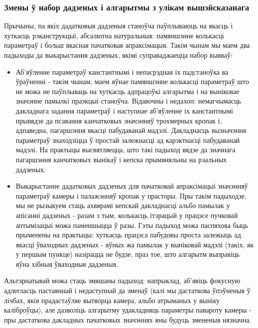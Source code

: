 \subsubsection*{Змены ў набор дадзеных і алгарытмы з улікам вышэйсказанага}
Прычыны, па якіх дадатковыя дадзеныя станоўча паўплываюць на якасць і хуткасць рэканструкцыі, абсалютна натуральныя: памяншэнне колькасці параметраў і больш якасная пачатковая апраксімацыя. Такім чынам мы маем два падыходы да выкарыстання дадзеных, якімі суправаджаецца набор выяваў:
\begin{itemize}
    \item Аб'яўленне параметраў канстантнымі і непасрэдная іх падстаноўка ва ўраўненні - такім чынам, маем яўнае памяншэнне колькасці параметраў што не можа не паўплываць на хуткасць адпрацоўкі алгарытма і на выніковае значэнне памылкі праэкцыі станоўча. Відавочны і недахоп: немагчымасць дакладнага задання параметраў і наступнае аб'яўленне іх канстантнымі прывядзе да псавання канчатковых значэнняў трохмерных кропак і, адпаведна, пагаршэння якасці пабудаванай мадэлі. Дакладнасць вызначэння параметраў знаходзіцца ў простай залежнасці ад карэктнасці пабудаванай мадэлі. На практыцы высвятляецца, што такі падыход вядзе да значнага пагаршэння канчатковых вынікаў і кепска прымяняльны на рэальных дадзеных.
    \item Выкарыстанне дадатковых дадзеных для пачатковай апраксімацыі значэнняў параметраў камеры і палажэнняў кропак у прасторы. Пры такім падыходзе, мы не рызыкуем стаць ахвярамі кепскай дакладнасці альбо памылак у апісанні дадзеных - разам з тым, колькасць ітэрацый у працэсе пучковай аптымізацыі можа паменшыцца ў разы. Гэты падыход можа паспяхова быць прыменены на практыцы: хуткасць працэса пабудовы проста залежыць ад якасці ўваходных дадзеных - яўных жа памылак у выніковай мадэлі (такіх, як у першым пункце) назірацца не будзе, праз тое, што алгарытм выправіць яўна хібныя ўваходныя дадзеныя.
\end{itemize}
Альтэрнатывай можа стаць змяшаны падыход: напрыклад, аб'явіць фокусную адлегласць пастаяннай і недаступнай да зменаў (калі мы дастаткова ўпэўненыя ў лічбах, якія прадастаўляе вытворца камера, альбо атрыманых у выніку каліброўцы), але дазволіць алгарытму удакладняць параметры павароту камеры - пры дастаткова дакладных пачатковых значэннях яны будуць змененыя нязначна. 

\newpage